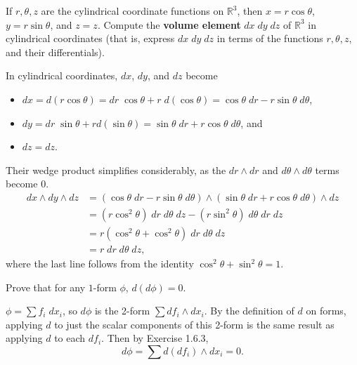 \documentclass[10pt]{report}
\begin{document}
\begin{exer}[1.6.6]
	If $r,\theta,z$ are the cylindrical coordinate functions on $\mathbb{R}^3$, then $x=r\cos \theta$, $y=r\sin\theta$, and $z=z$. Compute the \textbf{volume element} $dx\;dy\;dz$ of $\mathbb{R}^3$ in cylindrical coordinates (that is, express $dx\;dy\;dz$ in terms of the functions $r,\theta,z$, and their differentials).
\end{exer}
In cylindrical coordinates, $dx$, $dy$, and $dz$ become
\begin{itemize}
	\item $dx = d(r\cos\theta) = dr\;\cos\theta + r \;d(\cos\theta) = \cos\theta \;dr - r \sin\theta \;d\theta$,
	\item $dy = dr\;\sin\theta + r d(\sin\theta) = \sin\theta\;dr + r\cos\theta\;d\theta$, and
	\item $dz = dz$.
\end{itemize}
Their wedge product simplifies considerably, as the $dr \wedge dr$ and $d\theta \wedge d\theta$ terms become 0.
\begin{align*}
	dx \wedge dy \wedge dz &= (\cos\theta \;dr - r \sin\theta \;d\theta) \wedge (\sin\theta\;dr + r\cos\theta\;d\theta) \wedge dz \\
			       &= (r\cos^2\theta)\;dr\;d\theta\;dz - (r\sin^2\theta)\;d\theta\;dr\;dz \\
			       &= r (\cos^2\theta + \cos^2\theta) \;dr\;d\theta\;dz \\
			       &= r \;dr\;d\theta\;dz,
\end{align*}
where the last line follows from the identity $\cos^2\theta + \sin^2\theta = 1$.



\begin{exer}[1.6.7]
	Prove that for any $1$-form $\phi$, $d(d\phi)=0$.
\end{exer}
$\phi= \sum f_i \;dx_i$, so $d\phi$ is the 2-form $\sum df_i \wedge dx_i$. By the definition of $d$ on forms, applying $d$ to just the scalar components of this 2-form is the same result as applying $d$ to each $df_i$. Then by Exercise 1.6.3,
\[
	d\phi = \sum d(df_i) \wedge dx_i = 0.
\] 
\end{document}
